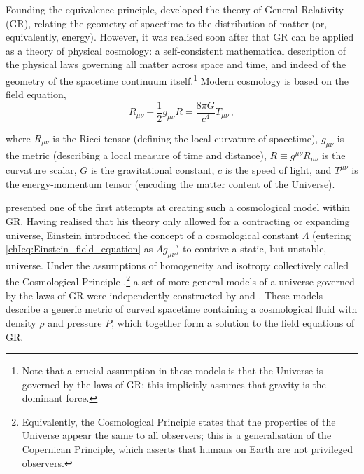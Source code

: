 Founding the equivalence principle, \citet{1915SPAW.......844E} developed the theory of General Relativity (GR), relating the geometry of spacetime to the distribution of matter (or, equivalently, energy). However, it was realised soon after that GR can be applied as a theory of physical cosmology: a self-consistent mathematical description of the physical laws governing all matter across space and time, and indeed of the geometry of the spacetime continuum itself.\footnote{Note that a crucial assumption in these models is that the Universe is governed by the laws of GR: this implicitly assumes that gravity is the dominant force.} Modern cosmology is based on the \citeauthor{1915SPAW.......844E} field equation,
\begin{equation}
    \label{chIeq:Einstein_field_equation}
    R_{\mu \nu} - \frac{1}{2} g_{\mu \nu} R = \frac{8 \pi G}{c^4} T_{\mu \nu} \, ,
\end{equation}

\noindent where $R_{\mu \nu}$ is the Ricci tensor (defining the local curvature of spacetime), $g_{\mu \nu}$ is the metric (describing a local measure of time and distance), $R \equiv g^{\mu \nu} R_{\mu \nu}$ is the curvature scalar, $G$ is the gravitational constant, $c$ is the speed of light, and $T^{\mu \nu}$ is the energy-momentum tensor (encoding the matter content of the Universe).

\citet{1917SPAW.......142E} presented one of the first attempts at creating such a cosmological model within GR. Having realised that his theory only allowed for a contracting or expanding universe, Einstein introduced the concept of a cosmological constant $\Lambda$ (entering \cref{chIeq:Einstein_field_equation} as $\Lambda g_{\mu \nu}$) to contrive a static, but unstable, universe. Under the assumptions of homogeneity and isotropy collectively called the Cosmological Principle \citep{1933ZA......6....1M},\footnote{Equivalently, the Cosmological Principle states that the properties of the Universe appear the same to all observers; this is a generalisation of the Copernican Principle, which asserts that humans on Earth are not privileged observers.} a set of more general models of a universe governed by the laws of GR were independently constructed by \citet{1922ZPhy...10..377F} and \citet{1927PhDT.........6L}. These models describe a generic metric of curved spacetime containing a cosmological fluid with density $\rho$ and pressure $P$, which together form a solution to the field equations of GR.

